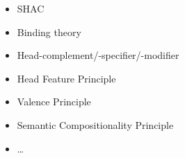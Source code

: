 \documentclass[a4paper,landscape,headrule,footrule]{foils}
\begin{document}
\begin{itemize}
\item SHAC
\item Binding theory
\item Head-complement/-specifier/-modifier
\item Head Feature Principle
\item Valence Principle
\item Semantic Compositionality Principle
\item \ldots 
\end{itemize}




\end{document}
